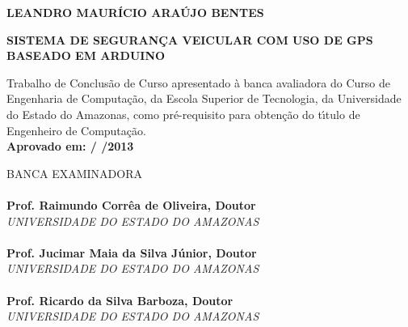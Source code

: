 \documentclass{dcctese}
\begin{document}
\newpage


\begin{center}
\bf LEANDRO MAUR\'{I}CIO ARA\'{U}JO BENTES\\[1.5 cm]
\end{center}

\begin{center}
\bf SISTEMA DE SEGURAN\c{C}A VEICULAR COM USO DE GPS BASEADO EM ARDUINO\\[1.5cm]
\end{center}

\hspace*{8cm}
\begin{minipage}{8cm} 

Trabalho de Conclus\~{a}o de Curso apresentado \`{a} 
banca avaliadora do Curso de Engenharia de Computa\c{c}\~{a}o, 
da Escola Superior de Tecnologia, da Universidade do Estado do Amazonas, 
como pr\'e-requisito para obten\c{c}\~{a}o do t\'{\i}tulo de 
Engenheiro de Computa\c{c}\~{a}o.\\

\large \bf Aprovado em:  /  /2013
\end{minipage} 

BANCA EXAMINADORA\\[12 pt]

\noindent \hrulefill \hspace*{6cm} \\
\noindent \textbf{Prof. Raimundo Corr\^{e}a de Oliveira, Doutor}\\
\textit{UNIVERSIDADE DO ESTADO DO AMAZONAS}\\[0.5cm]

\noindent \hrulefill \hspace*{6cm} \\
\noindent \textbf{Prof. Jucimar Maia da Silva J\'{u}nior, Doutor}\\
\textit{UNIVERSIDADE DO ESTADO DO AMAZONAS}\\[0.5cm]

\noindent \hrulefill \hspace*{6cm} \\
\noindent \textbf{Prof. Ricardo da Silva Barboza, Doutor}\\
\textit{UNIVERSIDADE DO ESTADO DO AMAZONAS}\\

\newpage
\end{document}
